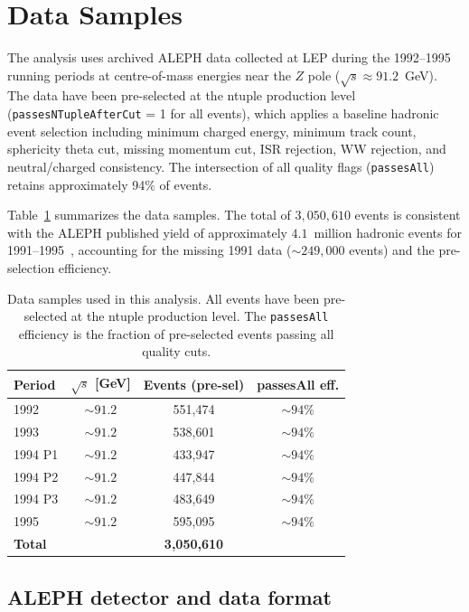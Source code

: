 \documentclass[11pt,a4paper]{article}
\begin{document}
\section{Data Samples}
\label{sec:data}

The analysis uses archived ALEPH data collected at LEP during the 1992--1995 running
periods at centre-of-mass energies near the $Z$ pole ($\sqrt{s} \approx 91.2$~GeV).
The data have been pre-selected at the ntuple production level
(\texttt{passesNTupleAfterCut} = 1 for all events), which applies a baseline hadronic
event selection including minimum charged energy, minimum track count, sphericity theta
cut, missing momentum cut, ISR rejection, WW rejection, and neutral/charged consistency.
The intersection of all quality flags (\texttt{passesAll}) retains approximately 94\%
of events.

Table~\ref{tab:data_samples} summarizes the data samples.  The total of
$3{,}050{,}610$ events is consistent with the ALEPH published yield of approximately
$4.1$~million hadronic events for 1991--1995~\cite{ALEPH:AFBb}, accounting for the
missing 1991 data ($\sim 249{,}000$ events) and the pre-selection efficiency.

\begin{table}[htbp]
\centering
\caption{Data samples used in this analysis. All events have been pre-selected at
the ntuple production level. The \texttt{passesAll} efficiency is the fraction of
pre-selected events passing all quality cuts.}
\label{tab:data_samples}
\begin{tabular}{lccc}
\toprule
Period & $\sqrt{s}$ [GeV] & Events (pre-sel) & passesAll eff. \\
\midrule
1992 & $\sim 91.2$ & 551,474 & $\sim 94\%$ \\
1993 & $\sim 91.2$ & 538,601 & $\sim 94\%$ \\
1994 P1 & $\sim 91.2$ & 433,947 & $\sim 94\%$ \\
1994 P2 & $\sim 91.2$ & 447,844 & $\sim 94\%$ \\
1994 P3 & $\sim 91.2$ & 483,649 & $\sim 94\%$ \\
1995 & $\sim 91.2$ & 595,095 & $\sim 94\%$ \\
\midrule
\textbf{Total} & & \textbf{3,050,610} & \\
\bottomrule
\end{tabular}
\end{table}

\subsection{ALEPH detector and data format}
\label{sec:aleph_detector}
\end{document}
